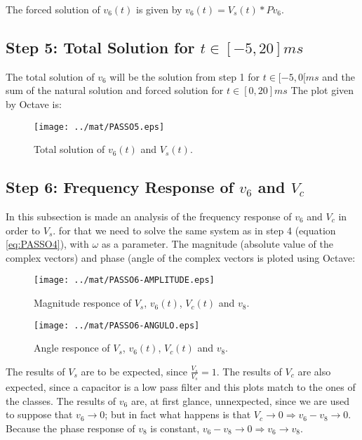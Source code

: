 The forced solution of $v_6(t)$ is given by $v_6(t) = V_s(t)*Pv_6$.

\subsection{Step 5: Total Solution for $t\in [-5,20]ms$}

The total solution of $v_6$ will be the solution from step 1 for $t\in [-5,0[ms$ and the sum of the natural solution and forced solution for $t\in [0,20]ms$
The plot given by Octave is:

\begin{figure}[h] \centering
\texttt{[image: ../mat/PASSO5.eps]}
\caption{Total solution of $v_6(t)$ and $V_s(t)$.}
\label{fig:TEO_TOT_SOL}
\end{figure}

\subsection{Step 6: Frequency Response of $v_6$ and $V_c$}

In this subsection is made an analysis of the frequency response of $v_6$ and $V_c$ in order to $V_s$. for that we need to solve the same system as in step 4 (equation \ref{eq:PASSO4}), with $\omega$ as a parameter. The magnitude (absolute value of the complex vectors) and phase (angle of the complex vectors is ploted using Octave:

\begin{figure}[h] \centering
\texttt{[image: ../mat/PASSO6-AMPLITUDE.eps]}
\caption{Magnitude responce of $V_s$, $v_6(t)$, $V_c(t)$ and $v_8$.}
\label{fig:TEO_MAG}
\end{figure}

\begin{figure}[h] \centering
\texttt{[image: ../mat/PASSO6-ANGULO.eps]}
\caption{Angle responce of $V_s$, $v_6(t)$, $V_c(t)$ and $v_8$.}
\label{fig:TEO_ANG}
\end{figure}

The results of $V_s$ are to be expected, since $\frac{V_s}{V_s}=1$.
The results of $V_c$ are also expected, since a capacitor is a low pass filter and this plots match to the ones of the classes.
The results of $v_6$ are, at first glance, unnexpected, since we are used to suppose that $v_6 \to 0$; but in fact what happens is that $V_c \to 0 \Rightarrow v_6 - v_8 \to 0$. Because the phase response of $v_8$ is constant, $v_6 - v_8 \to 0 \Rightarrow v_6 \to v_8$.




